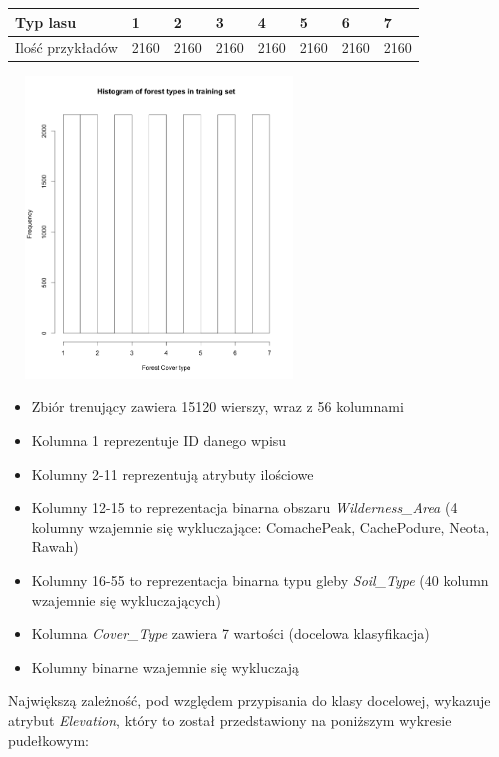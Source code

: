 \documentclass[11pt]{article} %
\begin{document}
\begin{center}
    \begin{tabular}{ llllllll }
    \hline
    	Typ lasu & 1 & 2 & 3 & 4 & 5 & 6 & 7 \\ \hline
    	Ilość przykładów & 2160 & 2160 & 2160 & 2160 &  2160 & 2160 & 2160 \\ \hline
    \end{tabular}
    \includegraphics[width=8cm, height=8cm]{histogram}
\end{center}

\begin{itemize}
\item Zbiór trenujący zawiera 15120 wierszy, wraz z 56 kolumnami
\item Kolumna 1 reprezentuje ID danego wpisu
\item Kolumny 2-11 reprezentują atrybuty ilościowe
\item Kolumny 12-15 to reprezentacja binarna obszaru \emph{Wilderness\_Area} (4 kolumny wzajemnie się wykluczające: ComachePeak, CachePodure, Neota, Rawah)
\item Kolumny 16-55 to reprezentacja binarna typu gleby \emph{Soil\_Type} (40 kolumn wzajemnie się wykluczających)
\item Kolumna \emph{Cover\_Type} zawiera 7 wartości (docelowa klasyfikacja)
\item Kolumny binarne wzajemnie się wykluczają
\end{itemize}

Największą zależność, pod względem przypisania do klasy docelowej, wykazuje atrybut \emph{Elevation}, który to został przedstawiony na poniższym wykresie pudełkowym:
\end{document}
